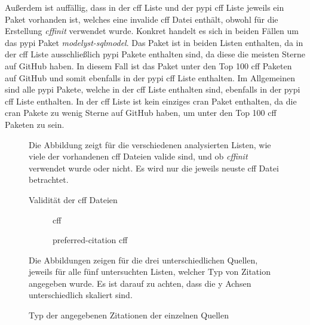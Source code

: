Außerdem ist auffällig, dass in der \gls{cff} Liste und der \gls{pypi} \gls{cff} Liste jeweils ein Paket vorhanden ist, welches eine invalide \gls{cff} Datei enthält, obwohl für die Erstellung \emph{cffinit} verwendet wurde.
Konkret handelt es sich in beiden Fällen um das \gls{pypi} Paket \emph{modelyst-sqlmodel}.
Das Paket ist in beiden Listen enthalten, da in der \gls{cff} Liste ausschließlich \gls{pypi} Pakete enthalten sind, da diese die meisten Sterne auf GitHub haben.
In diesem Fall ist das Paket unter den Top 100 \gls{cff} Paketen auf GitHub und somit ebenfalls in der \gls{pypi} \gls{cff} Liste enthalten.
Im Allgemeinen sind alle \gls{pypi} Pakete, welche in der \gls{cff} Liste enthalten sind, ebenfalls in der \gls{pypi} \gls{cff} Liste enthalten.
In der \gls{cff} Liste ist kein einziges \gls{cran} Paket enthalten, da die \gls{cran} Pakete zu wenig Sterne auf GitHub haben, um unter den Top 100 \gls{cff} Paketen zu sein.

\begin{figure}
    \centering
    
    \label{fig:overall_valid_cff}
    \caption{Validität der \gls{cff} Dateien}
    \small
    \raggedright
    Die Abbildung zeigt für die verschiedenen analysierten Listen, wie viele der vorhandenen \gls{cff} Dateien valide sind, und ob \emph{cffinit} verwendet wurde oder nicht. Es wird nur die jeweils neuste \gls{cff} Datei betrachtet.
\end{figure}

\begin{figure}
    \begin{subfigure}{.5\textwidth}
        \centering
        
        \caption{\gls{cff}}
        \label{fig:citation_counts_cff}
    \end{subfigure}%
    \begin{subfigure}{.5\textwidth}
        \centering
        
        \caption{\glqq preferred-citation\grqq{} \gls{cff}}
        \label{fig:citation_counts_preferred_citation_cff}
    \end{subfigure}
    \centering
    \begin{subfigure}{.5\textwidth}
        \centering
        
        \caption{}
        \label{fig:citation_counts_bib}
    \end{subfigure}
    \caption{Typ der angegebenen Zitationen der einzelnen Quellen}
    \small
    \raggedright
    Die Abbildungen zeigen für die drei unterschiedlichen Quellen, jeweils für alle fünf untersuchten Listen, welcher Typ von Zitation angegeben wurde. Es ist darauf zu achten, dass die y Achsen unterschiedlich skaliert sind.
\end{figure}

